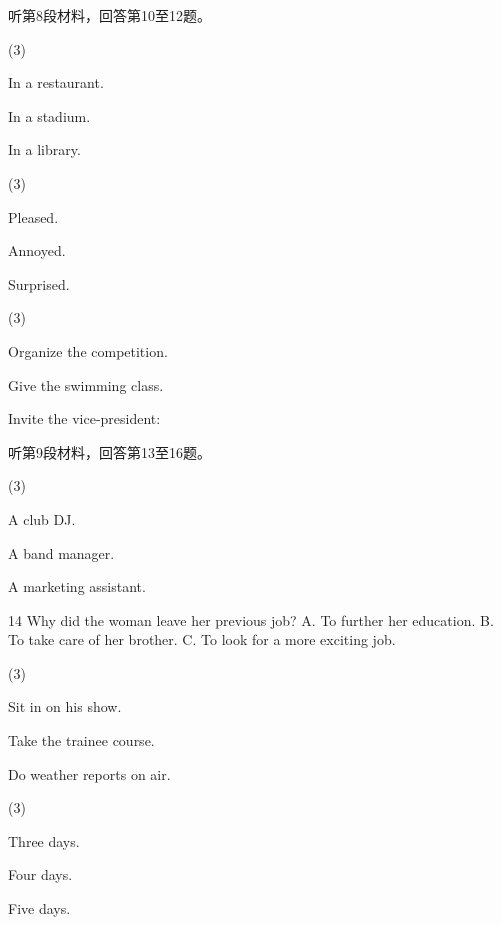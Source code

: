 \documentclass{英语试卷}
\begin{document}
\par 听第8段材料，回答第10至12题。\par
{}
\begin{choices}(3)
  \item In a restaurant.
  \item In a stadium.
  \item In a library.
\end{choices}
\begin{choices}(3)
  \item Pleased.
  \item Annoyed.
  \item Surprised.
\end{choices}
\begin{choices}(3)
  \item Organize the competition.
  \item Give the swimming class.
  \item Invite the vice-president:
\end{choices}
\par 听第9段材料，回答第13至16题。\par
{}
\begin{choices}(3)
  \item A club DJ.
  \item A band manager.
  \item A marketing assistant.
\end{choices}
\par 14 Why did the woman leave her previous job? A. To further her education. B. To take care of her brother. C. To look for a more exciting job.\par
{}
\begin{choices}(3)
  \item Sit in on his show.
  \item Take the trainee course.
  \item Do weather reports on air.
\end{choices}
\begin{choices}(3)
  \item Three days.
  \item Four days.
  \item Five days.
\end{choices}
\end{document}
